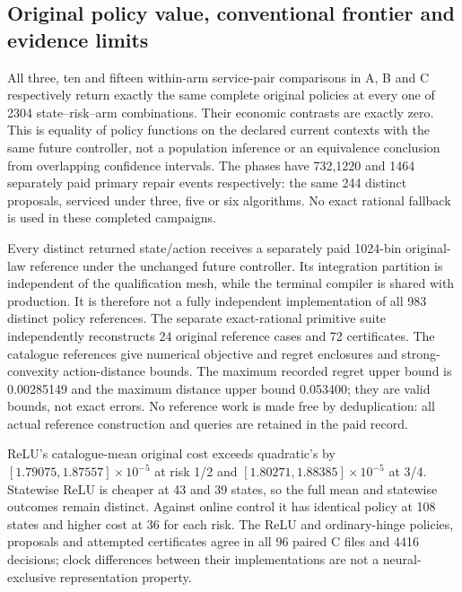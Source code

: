 \hypertarget{original-policy-value-conventional-frontier-and-evidence-limits}{%
\subsection{Original policy value, conventional frontier and evidence limits}\label{original-policy-value-conventional-frontier-and-evidence-limits}}

All three, ten and fifteen within-arm service-pair comparisons in A, B and C respectively return exactly the same complete original policies at every one of 2304 state--risk--arm combinations. Their economic contrasts are exactly zero. This is equality of policy functions on the declared current contexts with the same future controller, not a population inference or an equivalence conclusion from overlapping confidence intervals. The phases have 732,1220 and 1464 separately paid primary repair events respectively: the same 244 distinct proposals, serviced under three, five or six algorithms. No exact rational fallback is used in these completed campaigns.

Every distinct returned state/action receives a separately paid 1024-bin original-law reference under the unchanged future controller. Its integration partition is independent of the qualification mesh, while the terminal compiler is shared with production. It is therefore not a fully independent implementation of all 983 distinct policy references. The separate exact-rational primitive suite independently reconstructs 24 original reference cases and 72 certificates. The catalogue references give numerical objective and regret enclosures and strong-convexity action-distance bounds. The maximum recorded regret upper bound is 0.00285149 and the maximum distance upper bound 0.053400; they are valid bounds, not exact errors. No reference work is made free by deduplication: all actual reference construction and queries are retained in the paid record.

ReLU's catalogue-mean original cost exceeds quadratic's by \([1.79075,1.87557]\times10^{-5}\) at risk 1/2 and \([1.80271,1.88385]\times10^{-5}\) at 3/4. Statewise ReLU is cheaper at 43 and 39 states, so the full mean and statewise outcomes remain distinct. Against online control it has identical policy at 108 states and higher cost at 36 for each risk. The ReLU and ordinary-hinge policies, proposals and attempted certificates agree in all 96 paired C files and 4416 decisions; clock differences between their implementations are not a neural-exclusive representation property.

